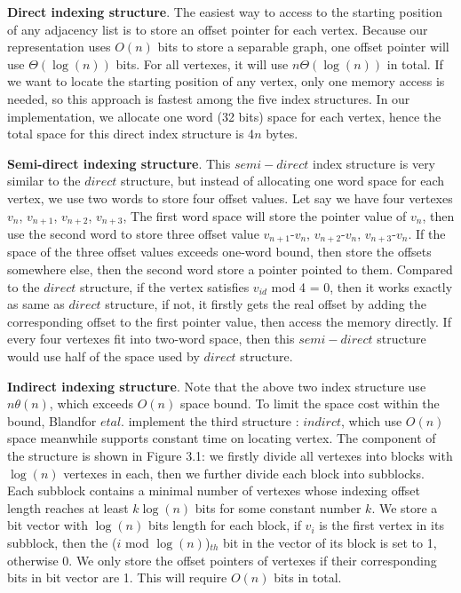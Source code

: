 \documentclass[12pt,glossary]{dalthesis}
\begin{document}
\bigskip
\bigskip

\textbf{Direct indexing structure}. The easiest way to access to the starting position of 
any adjacency list is to store an offset pointer for each vertex. Because our representation uses $O(n)$ bits to store a separable graph, one offset pointer will use $\Theta (\log (n))$ bits. For all vertexes, it will use $n \Theta (\log (n))$ in total. If we want to locate the starting position of any vertex, only one memory access is needed, so this approach is fastest among the five index structures. In our implementation, we allocate one word (32 bits) space for each vertex, hence the total space for this direct index structure is 4$n$ bytes.

\bigskip
\bigskip

\textbf{Semi-direct indexing structure}. This $semi-direct$ index structure is very similar to the $direct$ structure, but instead of allocating one word space for each vertex, we use two words to store four offset values. Let say we have four vertexes $v_{n}$, $v_{n+1}$, $v_{n+2}$, $v_{n+3}$, The first word space will store the pointer value of $v_{n}$, then use the second word to store three offset value $v_{n+1}$-$v_{n}$, $v_{n+2}$-$v_{n}$, $v_{n+3}$-$v_{n}$. If the space of the three offset values exceeds one-word bound, then store the offsets somewhere else, then the second word store a pointer pointed to them. Compared to the $direct$ structure, if the vertex satisfies $v_{id}$ mod 4 = 0, then it works exactly as same as $direct$ structure, if not, it firstly gets the real offset by adding the corresponding offset to the first pointer value, then access the memory directly. If every four vertexes fit into two-word space, then this $semi-direct$ structure would use half of the space used by $direct$ structure.      

\bigskip
\bigskip

\textbf{Indirect indexing structure}. Note that the above two index structure use $n \theta (n)$, which exceeds $O(n)$ space bound. To limit the space cost within the bound, Blandfor $et al.$ implement the third structure : $indirct$, which use $O(n)$ space meanwhile supports constant time on locating vertex. The component of the structure is shown in  Figure 3.1: we firstly divide all vertexes into blocks with $\log(n)$ vertexes in each, then we further divide each block into subblocks. Each subblock contains a minimal number of vertexes whose indexing offset length reaches at least $k\log(n)$ bits for some constant number $k$. We store a bit vector with $\log(n)$ bits length for each block, if $v_{i}$ is the first vertex in its subblock, then the ($i$ mod $\log (n)$)$_{th}$ bit in the vector of its block is set to 1, otherwise 0. We only store the offset pointers of vertexes if their corresponding bits in bit vector are 1. This will require $O(n)$ bits in total.  
\end{document}
